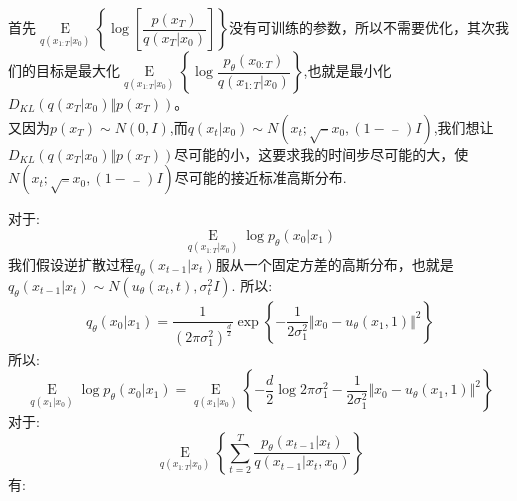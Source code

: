 \documentclass[withoutpreface,bwprint]{cumcmthesis} %
\begin{document}
			首先$\mathop{E}\limits_{ q(x_{1:T}|x_0) } \left\{ \log \left[ \dfrac{p(x_T)}{q(x_T|x_0)} \right] \right\}$没有可训练的参数，所以不需要优化，其次我们的目标是最大化$\mathop{E}\limits_{ q(x_{1:T}|x_0) }  \left\{ \log \dfrac{p_{\theta}(x_{0:T})}{q(x_{1:T}|x_0)} \right\} $,也就是最小化$D_{KL}(q(x_T|x_0) \Vert p(x_T))$。\\
			又因为$p(x_T) \sim N(0,I)$,而$q(x_{t}|x_{0}) \sim N(x_{t};\sqrt{\mathop{\alpha_t}\limits^{-}} x_0,\left( 1-\mathop{\alpha_t}\limits^{-} \right) I)$,我们想让$D_{KL}(q(x_T|x_0) \Vert p(x_T))$尽可能的小，这要求我的时间步尽可能的大，使$N(x_{t};\sqrt{\mathop{\alpha_t}\limits^{-}} x_0,\left( 1-\mathop{\alpha_t}\limits^{-} \right) I)$尽可能的接近标准高斯分布.
			
		对于:
		$$
			\mathop{E}\limits_{ q(x_{1:T}|x_0) } 
			\log  p_{\theta}(x_{0}|x_{1}) 
		$$
		我们假设逆扩散过程$q_{\theta}(x_{t-1}|x_{t})$服从一个固定方差的高斯分布，也就是$q_{\theta}(x_{t-1}|x_{t}) \sim N(u_{\theta}(x_t,t),\sigma_t^2I)$.
		所以:
		\begin{align*}
			q_{\theta}(x_{0}|x_{1})=\dfrac{1}{(2\pi \sigma_1^2)^{\frac{d}{2}}} \exp \left\{ - \dfrac{1}{2 \sigma_1^2} \Vert x_0-u_{\theta}(x_1,1) \Vert^2 \right\}
		\end{align*}
		所以:
		$$
		\mathop{E}\limits_{ q(x_{1}|x_0) } \log  p_{\theta}(x_{0}|x_{1}) =  \mathop{E}\limits_{ q(x_{1}|x_0) } 
		\left\{ -\dfrac{d}{2} \log 2\pi \sigma_1^2 -\dfrac{1}{2\sigma_1^2}\Vert x_0 - u_{\theta}(x_1,1) \Vert^2
		 \right\}
		$$
		对于:
		$$
			\mathop{E}\limits_{ q(x_{1:T}|x_0) } \left\{  
			\sum_{t=2}^{T} \dfrac{p_{\theta}(x_{t-1}|x_{t})}{q(x_{t-1}|x_t,x_0)}
			\right\}
		$$
		有:
\end{document}
